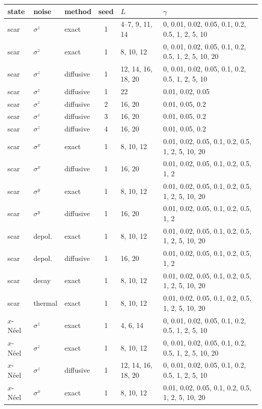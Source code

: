 \begin{center}
\small
\begin{longtable}{lllcp{2.6cm}p{6.2cm}}
\toprule state & noise & method & seed & $L$ & $\gamma$ \\ \midrule \endhead
scar & $\sigma^z$ & exact & 1 & 4--7, 9, 11, 14 & 0, 0.01, 0.02, 0.05, 0.1, 0.2, 0.5, 1, 2, 5, 10 \\
scar & $\sigma^z$ & exact & 1 & 8, 10, 12 & 0, 0.01, 0.02, 0.05, 0.1, 0.2, 0.5, 1, 2, 5, 10, 20 \\
scar & $\sigma^z$ & diffusive & 1 & 12, 14, 16, 18, 20 & 0, 0.01, 0.02, 0.05, 0.1, 0.2, 0.5, 1, 2, 5, 10 \\
scar & $\sigma^z$ & diffusive & 1 & 22 & 0.01, 0.02, 0.05 \\
scar & $\sigma^z$ & diffusive & 2 & 16, 20 & 0.01, 0.05, 0.2 \\
scar & $\sigma^z$ & diffusive & 3 & 16, 20 & 0.01, 0.05, 0.2 \\
scar & $\sigma^z$ & diffusive & 4 & 16, 20 & 0.01, 0.05, 0.2 \\
scar & $\sigma^x$ & exact & 1 & 8, 10, 12 & 0.01, 0.02, 0.05, 0.1, 0.2, 0.5, 1, 2, 5, 10, 20 \\
scar & $\sigma^x$ & diffusive & 1 & 16, 20 & 0.01, 0.02, 0.05, 0.1, 0.2, 0.5, 1, 2 \\
scar & $\sigma^y$ & exact & 1 & 8, 10, 12 & 0.01, 0.02, 0.05, 0.1, 0.2, 0.5, 1, 2, 5, 10, 20 \\
scar & $\sigma^y$ & diffusive & 1 & 16, 20 & 0.01, 0.02, 0.05, 0.1, 0.2, 0.5, 1, 2 \\
scar & depol. & exact & 1 & 8, 10, 12 & 0.01, 0.02, 0.05, 0.1, 0.2, 0.5, 1, 2, 5, 10, 20 \\
scar & depol. & diffusive & 1 & 16, 20 & 0.01, 0.02, 0.05, 0.1, 0.2, 0.5, 1, 2 \\
scar & decay & exact & 1 & 8, 10, 12 & 0.01, 0.02, 0.05, 0.1, 0.2, 0.5, 1, 2, 5, 10, 20 \\
scar & thermal & exact & 1 & 8, 10, 12 & 0.01, 0.02, 0.05, 0.1, 0.2, 0.5, 1, 2, 5, 10, 20 \\
$x$-N\'eel & $\sigma^z$ & exact & 1 & 4, 6, 14 & 0, 0.01, 0.02, 0.05, 0.1, 0.2, 0.5, 1, 2, 5, 10 \\
$x$-N\'eel & $\sigma^z$ & exact & 1 & 8, 10, 12 & 0, 0.01, 0.02, 0.05, 0.1, 0.2, 0.5, 1, 2, 5, 10, 20 \\
$x$-N\'eel & $\sigma^z$ & diffusive & 1 & 12, 14, 16, 18, 20 & 0, 0.01, 0.02, 0.05, 0.1, 0.2, 0.5, 1, 2, 5, 10 \\
$x$-N\'eel & $\sigma^x$ & exact & 1 & 8, 10, 12 & 0.01, 0.02, 0.05, 0.1, 0.2, 0.5, 1, 2, 5, 10, 20 \\

\end{longtable}
\end{center}
